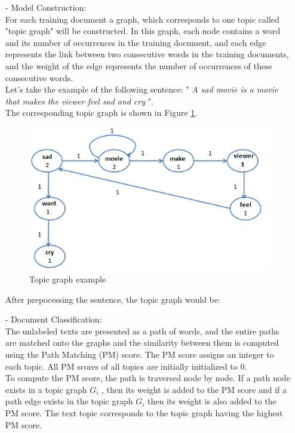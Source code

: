 				\begin{itemize}
				\item [-] Model Construction:\\
				For each training document a graph, which corresponds to one topic called "topic graph" will be constructed. In this graph, each node contains a word and its number of occurrences in the training document, and each edge represents the link between two consecutive words in the training documents, and the weight of the edge represents the number of occurrences of these consecutive words. \\
				Let's take the example of the following sentence: " \textit{A sad movie is a movie that makes the viewer feel sad and cry} ". \\
				The corresponding topic graph is shown in Figure \ref{topic}.
				\begin{figure}[h!]
					\centering
					\includegraphics[scale=0.7]{graphics/topicGr.PNG} 
					\caption{Topic graph example} \label{topic} 
				\end{figure} 
				After prepocessing the sentence, the topic graph would be: 
				\item [-] Document Classification:\\
				The unlabeled texts are presented as a path of words, and the entire paths are matched onto the graphs and the similarity between them is computed using the Path Matching (PM) score. The PM score assigns an integer to each topic. All PM scores of all topics are initially initialized to 0.\\
				To compute the PM score, the path is traversed node by node. If a path node exists in a topic graph $G_{i}$ , then its weight is added to the PM score and if a path edge exists in the topic graph $G_{i}$ then its weight is also added to the PM score. The text topic corresponds to the topic graph having the highest PM score. \\	

\end{itemize}
